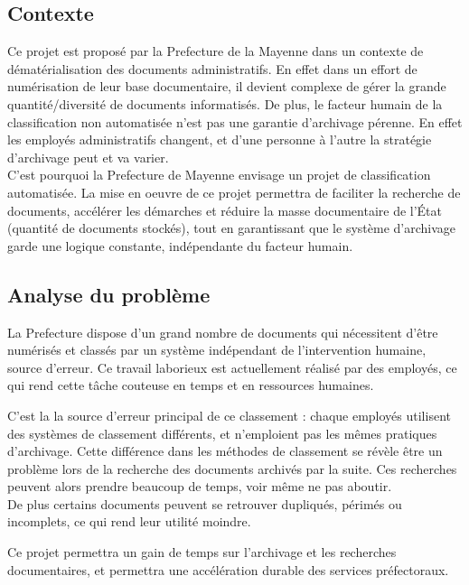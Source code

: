 
\subsection {Contexte}

Ce projet est proposé par la Prefecture de la Mayenne dans un contexte de dématérialisation des documents administratifs.
En effet dans un effort de numérisation de leur base documentaire, il devient complexe de gérer la grande quantité/diversité de documents informatisés. 
De plus, le facteur humain de la classification non automatisée n'est pas une garantie d'archivage pérenne.
En effet les employés administratifs changent, et d'une personne à l'autre la stratégie d'archivage peut et va varier. \\

C'est pourquoi la Prefecture de Mayenne envisage un projet de classification automatisée.
La mise en oeuvre de ce projet permettra de faciliter la recherche de documents, accélérer les démarches et réduire la masse documentaire de l'État (quantité de documents stockés), tout en garantissant que le système d'archivage garde une logique constante, indépendante du facteur humain.



\subsection {Analyse du problème}



La Prefecture dispose d'un grand nombre de documents qui nécessitent d'être numérisés et classés par un système indépendant de l'intervention humaine, source d'erreur.
Ce travail laborieux est actuellement réalisé par des employés, ce qui rend cette tâche couteuse en temps et en ressources humaines.

C'est la la source d'erreur principal de ce classement : chaque employés utilisent des systèmes de classement différents, et n'emploient pas les mêmes pratiques d'archivage.
Cette différence dans les méthodes de classement se révèle être un problème lors de la recherche des documents archivés par la suite.
Ces recherches peuvent alors prendre beaucoup de temps, voir même ne pas aboutir.
\\
De plus certains documents peuvent se retrouver dupliqués, périmés ou incomplets, ce qui rend leur utilité moindre.
\\
\par
Ce projet permettra un gain de temps sur l'archivage et les recherches documentaires, et permettra une accélération durable des services préfectoraux.


